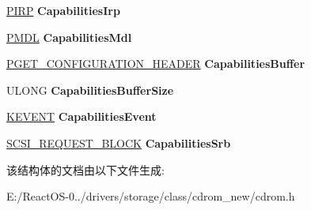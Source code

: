 \begin{DoxyCompactItemize}
\mbox{\label{struct___c_d_r_o_m___m_m_c___e_x_t_e_n_s_i_o_n_ac97aecc83a6e931656024842c37ca59e}} 
\hyperlink{interfacevoid}{P\+I\+RP} {\bfseries Capabilities\+Irp}
\item 
\mbox{\label{struct___c_d_r_o_m___m_m_c___e_x_t_e_n_s_i_o_n_ac3b422f9b9910179a7edf482f4efbf26}} 
\hyperlink{interfacevoid}{P\+M\+DL} {\bfseries Capabilities\+Mdl}
\item 
\mbox{\label{struct___c_d_r_o_m___m_m_c___e_x_t_e_n_s_i_o_n_a1849ba1ec41b6c134766cbbcd4101771}} 
\hyperlink{struct___g_e_t___c_o_n_f_i_g_u_r_a_t_i_o_n___h_e_a_d_e_r}{P\+G\+E\+T\+\_\+\+C\+O\+N\+F\+I\+G\+U\+R\+A\+T\+I\+O\+N\+\_\+\+H\+E\+A\+D\+ER} {\bfseries Capabilities\+Buffer}
\item 
\mbox{\label{struct___c_d_r_o_m___m_m_c___e_x_t_e_n_s_i_o_n_a75470b8393297f7168cd896476482684}} 
U\+L\+O\+NG {\bfseries Capabilities\+Buffer\+Size}
\item 
\mbox{\label{struct___c_d_r_o_m___m_m_c___e_x_t_e_n_s_i_o_n_a8f076235c515fddb4aed3c1242531ed7}} 
\hyperlink{struct___k_e_v_e_n_t}{K\+E\+V\+E\+NT} {\bfseries Capabilities\+Event}
\item 
\mbox{\label{struct___c_d_r_o_m___m_m_c___e_x_t_e_n_s_i_o_n_a57de592478965f3e2777e4aa20594bd3}} 
\hyperlink{struct___s_c_s_i___r_e_q_u_e_s_t___b_l_o_c_k}{S\+C\+S\+I\+\_\+\+R\+E\+Q\+U\+E\+S\+T\+\_\+\+B\+L\+O\+CK} {\bfseries Capabilities\+Srb}
\end{DoxyCompactItemize}


该结构体的文档由以下文件生成\+:\begin{DoxyCompactItemize}
\item 
E\+:/\+React\+O\+S-\/0../drivers/storage/class/cdrom\+\_\+new/cdrom.\+h\end{DoxyCompactItemize}
